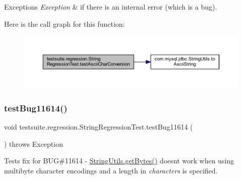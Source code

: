 \begin{DoxyExceptions}{Exceptions}
{\em Exception} & if there is an internal error (which is a bug). \\
\hline
\end{DoxyExceptions}
Here is the call graph for this function\+:
\nopagebreak
\begin{figure}[H]
\begin{center}
\leavevmode
\includegraphics[width=350pt]{classtestsuite_1_1regression_1_1_string_regression_test_a5a8cfa1befdedece1a323e0b37658e39_cgraph}
\end{center}
\end{figure}
\mbox{\label{classtestsuite_1_1regression_1_1_string_regression_test_a06cd6f2ea6096ebef7516e5ed1ff3659}} 
\subsubsection{\texorpdfstring{test\+Bug11614()}{testBug11614()}}
{\footnotesize\ttfamily void testsuite.\+regression.\+String\+Regression\+Test.\+test\+Bug11614 (\begin{DoxyParamCaption}{ }\end{DoxyParamCaption}) throws Exception}

Tests fix for B\+UG\#11614 -\/ \mbox{\hyperlink{classcom_1_1mysql_1_1jdbc_1_1_string_utils_ab237c5e450dc15a76201b3f13d44e6b3}{String\+Utils.\+get\+Bytes()}} doesn\textquotesingle{}t work when using multibyte character encodings and a length in {\itshape characters} is specified.


